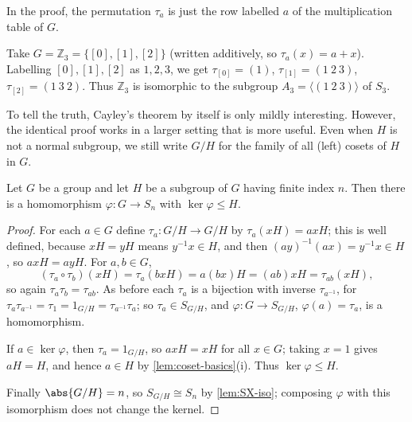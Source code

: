 \begin{remark}
	In the proof, the permutation \(\tau_a\) is just the row labelled \(a\) of the
	multiplication table of \(G\).
\end{remark}

\begin{eg}
	Take \(G = \mathbb Z_3 = \{[0],[1],[2]\}\) (written additively, so
	\(\tau_a(x) = a + x\)). Labelling \([0],[1],[2]\) as \(1,2,3\), we get
	\(\tau_{[0]} = (1)\), \(\tau_{[1]} = (1\ 2\ 3)\), \(\tau_{[2]} = (1\ 3\ 2)\). Thus
	\(\mathbb Z_3\) is isomorphic to the subgroup \(A_3 = \langle(1\ 2\ 3)\rangle\) of
	\(S_3\).
\end{eg}

To tell the truth, Cayley's theorem by itself is only mildly interesting. However, the
identical proof works in a larger setting that is more useful. Even when \(H\) is not a
normal subgroup, we still write \(G/H\) for the family of all (left) cosets of \(H\) in
\(G\).

\begin{theorem}\label{thm:rep-on-cosets}
	Let \(G\) be a group and let \(H\) be a subgroup of \(G\) having finite index \(n\).
	Then there is a homomorphism \(\varphi\colon G \to S_n\) with \(\ker\varphi \leq H\).
\end{theorem}

\begin{proof}
	For each \(a \in G\) define \(\tau_a\colon G/H \to G/H\) by \(\tau_a(xH) = axH\); this
	is well defined, because \(xH = yH\) means \(y^{-1}x \in H\), and then
	\((ay)^{-1}(ax) = y^{-1}x \in H\), so \(axH = ayH\). For \(a, b \in G\),
	\[
		(\tau_a \circ \tau_b)(xH) = \tau_a(bxH) = a(bx)H = (ab)xH = \tau_{ab}(xH),
	\]
	so again \(\tau_a\tau_b = \tau_{ab}\). As before each \(\tau_a\) is a bijection with
	inverse \(\tau_{a^{-1}}\), for \(\tau_a\tau_{a^{-1}} = \tau_1 = 1_{G/H}
	= \tau_{a^{-1}}\tau_a\); so \(\tau_a \in S_{G/H}\), and
	\(\varphi\colon G \to S_{G/H}\), \(\varphi(a) = \tau_a\), is a homomorphism.

	If \(a \in \ker\varphi\), then \(\tau_a = 1_{G/H}\), so \(axH = xH\) for all
	\(x \in G\); taking \(x = 1\) gives \(aH = H\), and hence \(a \in H\) by
	\autoref{lem:coset-basics}(i). Thus \(\ker\varphi \leq H\).

	Finally \(\abs{G/H} = n\), so \(S_{G/H} \cong S_n\) by \autoref{lem:SX-iso}; composing
	\(\varphi\) with this isomorphism does not change the kernel.
\end{proof}

